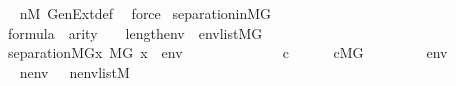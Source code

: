 \begin{isabellebody}
\ \ \ \ \isamarkupfalse%
\ {\isacartoucheopen}{\isacharquery}{\kern0pt}n{\isasymin}M{\isacartoucheclose}\ GenExt{\isacharunderscore}{\kern0pt}def\ \isamarkupfalse%
\ force\isanewline
{}\isamarkupfalse%
%
\endisatagproof
{\isafoldproof}%
%
\isadelimproof
\isanewline
%
\endisadelimproof
\isanewline
{}\isamarkupfalse%
\ separation{\isacharunderscore}{\kern0pt}in{\isacharunderscore}{\kern0pt}MG{\isacharcolon}{\kern0pt}\isanewline
\ \ \ \isanewline
\ \ \ \ {\isachardoublequoteopen}{\isasymphi}{\isasymin}formula{\isachardoublequoteclose}\ \ {\isachardoublequoteopen}arity{\isacharparenleft}{\kern0pt}{\isasymphi}{\isacharparenright}{\kern0pt}\ {\isasymle}\ {}\ {\isacharhash}{\kern0pt}{\isacharplus}{\kern0pt}\ length{\isacharparenleft}{\kern0pt}env{\isacharparenright}{\kern0pt}{\isachardoublequoteclose}\ \ {\isachardoublequoteopen}env{\isasymin}list{\isacharparenleft}{\kern0pt}M{\isacharbrackleft}{\kern0pt}G{\isacharbrackright}{\kern0pt}{\isacharparenright}{\kern0pt}{\isachardoublequoteclose}\isanewline
\ \ \ \ \isanewline
\ \ \ \ {\isachardoublequoteopen}separation{\isacharparenleft}{\kern0pt}{\isacharhash}{\kern0pt}{\isacharhash}{\kern0pt}M{\isacharbrackleft}{\kern0pt}G{\isacharbrackright}{\kern0pt}{\isacharcomma}{\kern0pt}{\isasymlambda}x{\isachardot}{\kern0pt}\ {\isacharparenleft}{\kern0pt}M{\isacharbrackleft}{\kern0pt}G{\isacharbrackright}{\kern0pt}{\isacharcomma}{\kern0pt}\ {\isacharbrackleft}{\kern0pt}x{\isacharbrackright}{\kern0pt}\ {\isacharat}{\kern0pt}\ env\ {\isasymTurnstile}\ {\isasymphi}{\isacharparenright}{\kern0pt}{\isacharparenright}{\kern0pt}{\isachardoublequoteclose}\isanewline
%
\isadelimproof
%
\endisadelimproof
%
\isatagproof
{}\isamarkupfalse%
\ {\isacharminus}{\kern0pt}\isanewline
\ \ \isacommand{{\isacharbraceleft}{\kern0pt}}\isamarkupfalse%
\ \isanewline
\ \ \ \ \isamarkupfalse%
\ c\isanewline
\ \ \ \ \isamarkupfalse%
\ {\isachardoublequoteopen}c{\isasymin}M{\isacharbrackleft}{\kern0pt}G{\isacharbrackright}{\kern0pt}{\isachardoublequoteclose}\ \isanewline
\ \ \ \ \isamarkupfalse%
\ \isamarkupfalse%
\ {\isacartoucheopen}env\ {\isasymin}\ {\isacharunderscore}{\kern0pt}{\isacartoucheclose}\isanewline
\ \ \ \ \isamarkupfalse%
\ nenv\ \ \ {\isachardoublequoteopen}nenv{\isasymin}list{\isacharparenleft}{\kern0pt}M{\isacharparenright}{\kern0pt}{\isachardoublequoteclose}\ \isanewline

\end{isabellebody}

